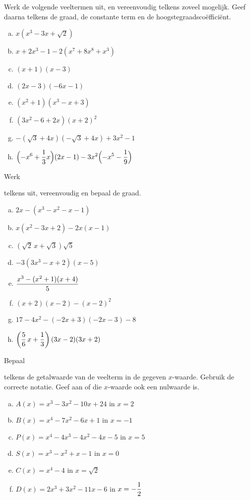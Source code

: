 \documentclass{ximera}
\begin{document}
\begin{exercise} 
Werk de volgende veeltermen uit, en vereenvoudig telkens zoveel mogelijk. Geef daarna telkens de graad, de constante term en de hoogstegraadsco\"effici\"ent.
\begin{multicols}{2}
\begin{enumerate}[(a)]
\item
$x(x^3-3x+\sqrt{2})$
\item
$x+2x^3-1-2(x^7+8x^8+x^3)$
\item
$(x+1)(x-3)$
\item
$(2x-3)(-6x-1)$
\item
$(x^2+1)(x^3-x+3)$
\item
$(3x^2-6+2x)(x+2)^2$
\item
$-(\sqrt{3}+4x)(-\sqrt{3}+4x)+3x^2-1$
\item
$\displaystyle \Bigl(-x^6 + \frac{1}{3}x\Bigr)(2x-1) - 3x^2\Bigl(-x^5-\frac{1}{9}\Bigr)$
\end{enumerate}
\end{multicols} 
\end{exercise} 

\begin{exercise} 
\hypertarget{oef1.7}{Werk} telkens uit, vereenvoudig en bepaal de graad. 
\begin{multicols}{2}
\begin{enumerate}[(a)]
\item
$2x-(x^3-x^2-x-1)$
\item
$x(x^2-3x+2)-2x(x-1)$
\item
$\left(\sqrt{2}\,x+\sqrt{3}\right)\sqrt{5}$
\item
$-3(3x^3-x+2)(x-5)$
\item
$\displaystyle \frac{x^3-(x^2+1)(x+4)}{5}$
\item
$(x+2)(x-2)-(x-2)^2$
\item
$17-4x^2-(-2x+3)(-2x-3)-8$
\item
$\displaystyle \left(\frac{5}{6}\,x+\frac{1}{3}\right)(3x-2)(3x+2)$
\end{enumerate}
\end{multicols}
\end{exercise} 

\begin{exercise} 
\hypertarget{oef1.8}{Bepaal} telkens de getalwaarde van de veelterm in de gegeven $x$-waarde. Gebruik de correcte notatie. Geef aan of die $x$-waarde ook een nulwaarde is. 
\begin{enumerate}[(a)]
\item
$A(x) = x^3-3x^2-10x+24$ \quad in $x = 2$
\item
$B(x) = x^4-7x^2-6x+1$ \quad in $x = -1$
\item
$P(x) = x^4-4x^3-4x^2-4x-5$ \quad in $x = 5$
\item
$S(x) = x^3-x^2+x-1$ \quad in $x = 0$
\item
$C(x) = x^4-4$ \quad in $x = \sqrt{2}$
\item
$D(x) = 2x^3 + 3x^2 - 11x - 6$ \quad in $\displaystyle x = -\frac{1}{2}$
\end{enumerate}
\end{exercise} 
\end{document}
